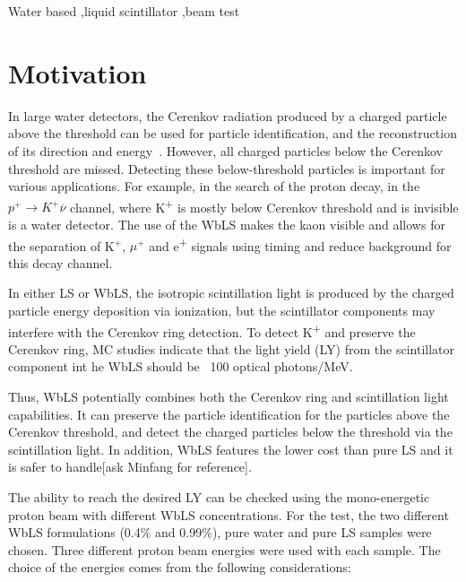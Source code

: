 \documentclass[preprint,12pt]{elsarticle}
\begin{document}
\begin{frontmatter}
\begin{abstract}
\end{abstract}

\begin{keyword}
Water based \sep liquid scintillator \sep beam test

\end{keyword}

\end{frontmatter}

 \linenumbers

\section{Motivation}
\label{introAndMotivation}
In large water detectors, the Cerenkov radiation produced by a charged particle above the threshold can be used for particle identification, and the reconstruction of its direction and energy~\cite{superKkinematik}. However, all charged particles below the Cerenkov threshold are missed. Detecting these below-threshold particles is important for various applications. For example, in the search of the proton decay, in the $p^{+} \rightarrow K^{+} \overline{\nu}$ channel, where K\textsuperscript{+} is mostly below Cerenkov threshold and is invisible is a water detector. The use of the WbLS makes the kaon visible and allows for the 
separation of K$^{+}$, $\mu^{+}$ and e\textsuperscript{+} signals using timing and reduce background for this decay channel.

In either LS or WbLS, the isotropic scintillation light is produced by the charged particle energy deposition via ionization, but the scintillator components may interfere with the Cerenkov ring detection. To detect K\textsuperscript{+} and preserve the Cerenkov ring, MC studies indicate that the light yield (LY) from the scintillator component int he WbLS should be ~100 optical photons/MeV.

Thus, WbLS potentially combines both the Cerenkov ring and scintillation light capabilities. It can preserve the particle identification for the particles above the Cerenkov threshold, and detect the charged particles below the threshold via the scintillation light. In addition, WbLS features the lower cost than pure LS and it is safer to handle[ask Minfang for reference].

The ability to reach the desired LY can be checked using the mono-energetic proton beam with different WbLS concentrations. For the test, the two different WbLS formulations (0.4$\%$ and 0.99$\%$), pure water and pure LS samples were chosen. Three different proton beam energies were used with each sample. The choice of the energies comes from the following considerations: 
\end{document}
